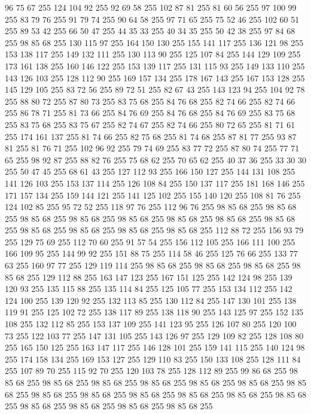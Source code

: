 96 75 67 255 124 104 92 255 92 69 58 255 102 87 81 255 81 60 56 255 97 100 99 255 83 79 76 255 91 79 74 255 90 64 58 255 97 71 65 255 75 52 46 255 102 60 51 255 89 53 42 255 66 50 47 255 44 35 33 255 40 34 35 255 50 42 38 255 97 84 68 255 98 85 68 255 130 115 97 255 164 150 130 255 155 141 117 255 136 121 98 255 153 138 117 255 149 132 111 255 130 113 90 255 125 107 84 255 144 129 109 255 173 161 138 255 160 146 122 255 153 139 117 255 131 115 93 255 149 133 110 255 143 126 103 255 128 112 90 255 169 157 134 255 178 167 143 255 167 153 128 255 145 129 105 255 83 72 56 255 89 72 51 255 82 67 43 255 143 123 94 255 104 92 78 255 88 80 72 255 87 80 73 255 83 75 68 255 84 76 68 255 82 74 66 255 82 74 66 255 86 78 71 255 81 73 66 255 84 76 69 255 84 76 68 255 84 76 69 255 83 75 68 255 83 75 68 255 83 75 67 255 82 74 67 255 82 74 66 255 80 72 65 255 81 71 61 255 174 161 137 255 81 74 66 255
82 75 68 255 81 74 68 255 87 81 77 255 93 87 81 255 81 76 71 255 102 96 92 255 79 74 69 255 83 77 72 255 87 80 74 255 77 71 65 255 98 92 87 255 88 82 76 255 75 68 62 255 70 65 62 255 40 37 36 255 33 30 30 255 50 47 45 255 68 61 43 255 127 112 93 255 166 150 127 255 144 131 108 255 141 126 103 255 153 137 114 255 126 108 84 255 150 137 117 255 181 168 146 255 171 157 134 255 159 144 121 255 141 125 102 255 155 140 120 255 108 81 76 255 124 102 85 255 95 72 52 255 118 97 76 255 112 96 76 255 98 85 68 255 98 85 68 255 98 85 68 255 98 85 68 255 98 85 68 255 98 85 68 255 98 85 68 255 98 85 68 255 98 85 68 255 98 85 68 255 98 85 68 255 98 85 68 255 112 88 72 255 156 93 79 255 129 75 69 255 112 70 60 255 91 57 54 255 156 112 105 255 166 111 100 255 166 109 95 255 144 99 92 255 151 88 75 255 114 58 46 255 125 76 66 255 133 77 63 255 160 97 77 255 129 119 114 255 98 85 68 255 98 85 68 255
98 85 68 255 98 85 68 255 129 112 88 255 163 147 123 255 167 151 125 255 142 124 98 255 139 120 93 255 135 115 88 255 135 114 84 255 125 105 77 255 153 134 112 255 142 124 100 255 139 120 92 255 132 113 85 255 130 112 84 255 147 130 101 255 138 119 91 255 125 102 72 255 138 117 89 255 138 118 90 255 143 125 97 255 152 135 108 255 132 112 85 255 153 137 109 255 141 123 95 255 126 107 80 255 120 100 73 255 122 103 77 255 147 131 105 255 143 126 97 255 129 109 82 255 128 108 80 255 165 150 125 255 163 147 117 255 146 128 101 255 159 141 115 255 140 124 98 255 174 158 134 255 169 153 127 255 129 110 83 255 150 133 108 255 128 111 84 255 107 89 70 255 115 92 70 255 120 103 78 255 128 112 89 255 99 86 68 255 98 85 68 255 98 85 68 255 98 85 68 255 98 85 68 255 98 85 68 255 98 85 68 255 98 85 68 255 98 85 68 255 98 85 68 255 98 85 68 255 98 85 68 255 98 85 68 255 98 85 68 255 98 85 68 255 98 85 68 255 98 85 68 255 98 85 68 255
